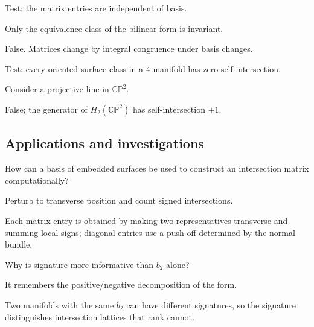 \begin{exercise}\label{exr:viii34-ped-11}
Test: the matrix entries are independent of basis.
\end{exercise}
\begin{hint}
Only the equivalence class of the bilinear form is invariant.
\end{hint}
\begin{solution}
False. Matrices change by integral congruence under basis changes.
\end{solution}

\begin{exercise}\label{exr:viii34-ped-12}
Test: every oriented surface class in a $4$-manifold has zero self-intersection.
\end{exercise}
\begin{hint}
Consider a projective line in $\mathbb{CP}^2$.
\end{hint}
\begin{solution}
False; the generator of $H_2(\mathbb{CP}^2)$ has self-intersection $+1$.
\end{solution}

\subsection*{Applications and investigations}

\begin{exercise}\label{exr:viii34-ped-13}
How can a basis of embedded surfaces be used to construct an intersection matrix computationally?
\end{exercise}
\begin{hint}
Perturb to transverse position and count signed intersections.
\end{hint}
\begin{solution}
Each matrix entry is obtained by making two representatives transverse and summing local signs; diagonal entries use a push-off determined by the normal bundle.
\end{solution}

\begin{exercise}\label{exr:viii34-ped-14}
Why is signature more informative than $b_2$ alone?
\end{exercise}
\begin{hint}
It remembers the positive/negative decomposition of the form.
\end{hint}
\begin{solution}
Two manifolds with the same $b_2$ can have different signatures, so the signature distinguishes intersection lattices that rank cannot.
\end{solution}

